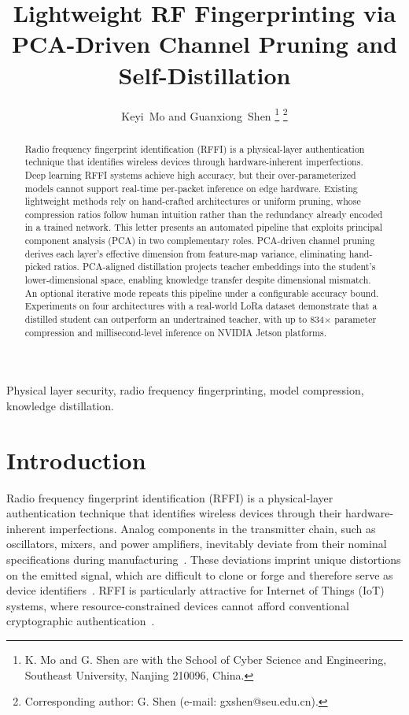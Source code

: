 \documentclass[journal,comsoc]{IEEEtran}
\begin{document}
\title{Lightweight RF Fingerprinting via PCA-Driven Channel Pruning and Self-Distillation}

\author{Keyi~Mo and Guanxiong~Shen%
\thanks{K. Mo and G. Shen are with the School of Cyber Science and Engineering, Southeast University, Nanjing 210096, China.}%
\thanks{Corresponding author: G. Shen (e-mail: gxshen@seu.edu.cn).}%
}

\maketitle


\begin{abstract}
Radio frequency fingerprint identification (RFFI) is a physical-layer authentication technique that identifies wireless devices through hardware-inherent imperfections.
Deep learning RFFI systems achieve high accuracy, but their over-parameterized models cannot support real-time per-packet inference on edge hardware.
Existing lightweight methods rely on hand-crafted architectures or uniform pruning, whose compression ratios follow human intuition rather than the redundancy already encoded in a trained network.
This letter presents an automated pipeline that exploits principal component analysis (PCA) in two complementary roles.
PCA-driven channel pruning derives each layer's effective dimension from feature-map variance, eliminating hand-picked ratios.
PCA-aligned distillation projects teacher embeddings into the student's lower-dimensional space, enabling knowledge transfer despite dimensional mismatch.
An optional iterative mode repeats this pipeline under a configurable accuracy bound.
Experiments on four architectures with a real-world LoRa dataset demonstrate that a distilled student can outperform an undertrained teacher, with up to 834$\times$ parameter compression and millisecond-level inference on NVIDIA Jetson platforms.
\end{abstract}


\begin{IEEEkeywords}
Physical layer security, radio frequency fingerprinting, model compression, knowledge distillation.
\end{IEEEkeywords}


\section{Introduction}
\label{sec:intro}

Radio frequency fingerprint identification (RFFI) is a physical-layer authentication technique that identifies wireless devices through their hardware-inherent imperfections.
Analog components in the transmitter chain, such as oscillators, mixers, and power amplifiers, inevitably deviate from their nominal specifications during manufacturing~\cite{polak2011identifying,zhang2021radio}.
These deviations imprint unique distortions on the emitted signal, which are difficult to clone or forge and therefore serve as device identifiers~\cite{peng2019design,zhang2025physical}.
RFFI is particularly attractive for Internet of Things (IoT) systems, where resource-constrained devices cannot afford conventional cryptographic authentication~\cite{zhang2025physical}.
\end{document}
